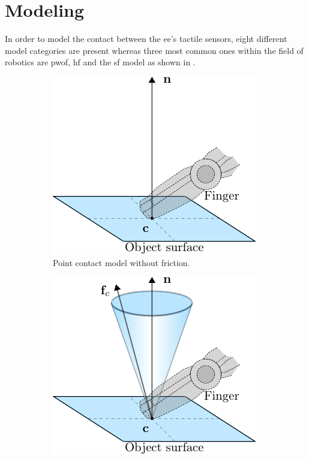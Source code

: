 
\chapter{Modeling} \label{ch:modeling}

In order to model the contact between the \gls{ee}'s tactile sensors, eight different model categories are present\cite*{articulated-hands-force-control-and-kinematic-issues} whereas three most common ones within the field of robotics\cite[Chapter 37]{handbook-of-robotics} are \gls{pwof}, \gls{hf} and the \gls{sf} model as shown in . \medskip

\begin{figure}[h]
	\centering
	\begin{subfigure}[b]{0.3\textwidth}
		\centering
		\includegraphics[width=\textwidth]{chapters/modeling/fig/contact-no-friction.pdf}
		\caption{Point contact model without friction.}
		\label{fig:pwof}
	\end{subfigure}
	\hfill
	\begin{subfigure}[b]{0.3\textwidth}
		\centering
		\includegraphics[width=\textwidth]{chapters/modeling/fig/hf.pdf}

\end{subfigure}
\end{figure}
